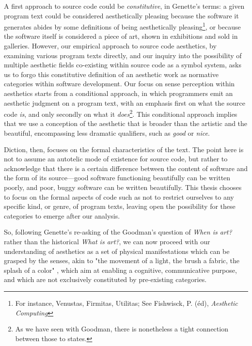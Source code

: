A first approach to source code could be \emph{constitutive}, in Genette's terms: a given program text could be considered aesthetically pleasing because the software it generates abides by some definitions of being aesthetically pleasing\footnote{For instance, Venustas, Firmitas, Utilitas; See Fishwisck, P. (éd), \emph{Aesthetic Computing}}, or because the software itself is considered a piece of art, shown in exhibitions and sold in galleries. However, our empirical approach to source code aesthetics, by examining various program texts directly, and our inquiry into the possibility of multiple aesthetic fields co-existing within source code as a symbol system, asks us to forgo this constitutive definition of an aesthetic work as normative categories within software development. Our focus on sense perception within aesthetics starts from a conditional approach, in which programmers emit an aesthetic judgment on a program text, with an emphasis first on what the source code \emph{is}, and only secondly on what it \emph{does}\footnote{As we have seen with Goodman, there is nonetheless a tight connection between those to states.}. This conditional approach implies that we use a conception of the aesthetic that is broader than the artistic and the beautiful, encompassing less dramatic qualifiers, such as \emph{good} or \emph{nice}.

Diction, then, focuses on the formal characteristics of the text. The point here is not to assume an autotelic mode of existence for source code, but rather to acknowledge that there is a certain difference between the content of software and the form of its source—good software functioning beautifully can be written poorly, and poor, buggy software can be written beautifully. This thesis chooses to focus on the formal aspects of code such as not to restrict ourselves to any specific kind, or genre, of program texts, leaving open the possibility for these categories to emerge after our analysis.

So, following Genette's re-asking of the Goodman's question of \emph{When is art?} rather than the historical \emph{What is art?}, we can now proceed with our understanding of aesthetics as a set of physical manifestations which can be grasped by the senses, akin to "the movement of a light, the brush a fabric, the splash of a color" \citep{ranciere_aisthesis_2013}, which aim at enabling a cognitive, communicative purpose, and which are not exclusively constituted by pre-existing categories.

